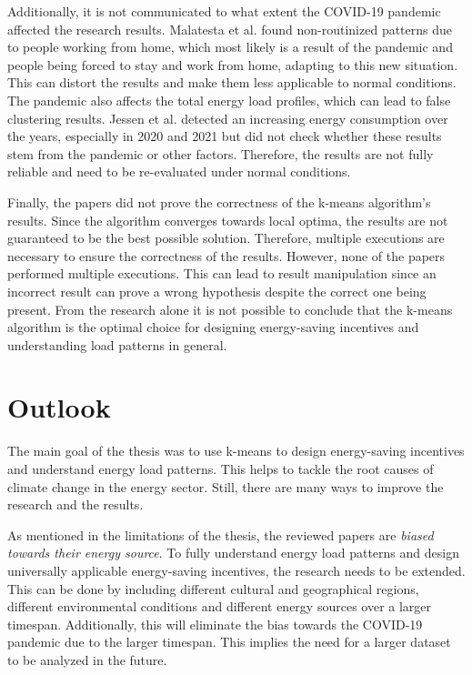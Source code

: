 Additionally, it is not communicated to what extent the COVID-19 pandemic affected the research results.
Malatesta et al. \cite{MAL-HBP} found non-routinized patterns due to people working from home, which most likely is a result of the pandemic and people being forced to stay and work from home, adapting to this new situation.
This can distort the results and make them less applicable to normal conditions.
The pandemic also affects the total energy load profiles, which can lead to false clustering results.
Jessen et al. \cite{JES-IND} detected an increasing energy consumption over the years, especially in 2020 and 2021 but did not check whether these results stem from the pandemic or other factors.
Therefore, the results are not fully reliable and need to be re-evaluated under normal conditions.

Finally, the papers did not prove the correctness of the k-means algorithm's results.
Since the algorithm converges towards local optima, the results are not guaranteed to be the best possible solution.
Therefore, multiple executions are necessary to ensure the correctness of the results.
However, none of the papers performed multiple executions.
This can lead to result manipulation since an incorrect result can prove a wrong hypothesis despite the correct one being present.
From the research alone it is not possible to conclude that the k-means algorithm is the optimal choice for designing energy-saving incentives and understanding load patterns in general.


\section{Outlook}
The main goal of the thesis was to use k-means to design energy-saving incentives and understand energy load patterns.
This helps to tackle the root causes of climate change in the energy sector.
Still, there are many ways to improve the research and the results.

As mentioned in the limitations of the thesis, the reviewed papers are \textit{biased towards their energy source}.
To fully understand energy load patterns and design universally applicable energy-saving incentives, the research needs to be extended.
This can be done by including different cultural and geographical regions, different environmental conditions and different energy sources over a larger timespan.
Additionally, this will eliminate the bias towards the COVID-19 pandemic due to the larger timespan.
This implies the need for a larger dataset to be analyzed in the future.

